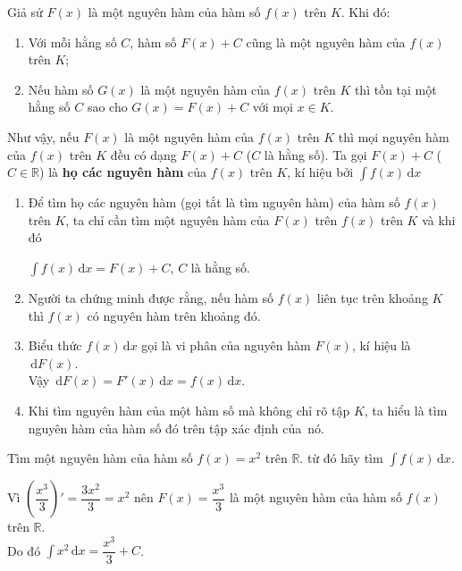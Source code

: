\documentclass[12pt,aspectratio=169]{beamer}
\begin{document}
\begin{tomtat}
	\begin{dn}
		Giả sử $F(x)$ là một nguyên hàm của hàm số $f(x)$ trên $K$. Khi đó:
		\begin{enumerate}
			\item Với mỗi hằng số $C$, hàm số $F(x) + C$ cũng là một nguyên hàm của $f(x)$ trên $K$;
			\item Nếu hàm số $G(x)$ là một nguyên hàm của $f(x)$ trên $K$ thì tồn tại một hằng số $C$ sao cho $G(x) = F(x) + C$ với mọi $x \in K$.
		\end{enumerate}
		Như vậy, nếu $F(x)$ là một nguyên hàm của $f(x)$ trên $K$ thì mọi nguyên hàm của $f(x)$ trên $K$ đều có dạng $F(x) + C$ ($C$ là hằng số). Ta gọi $F(x) + C$ ($C \in \mathbb{R}$) là \textbf{họ các nguyên hàm} của $f(x)$ trên $K$, kí hiệu bởi $\displaystyle\int f(x)\mathrm{\,d}x$
	\end{dn}
\end{tomtat}
\begin{tomtat}
	\begin{note}
		\begin{enumerate}[itemsep=6pt]
			\item Để tìm họ các nguyên hàm (gọi tắt là tìm nguyên hàm) của hàm số $f(x)$ trên $K$, ta chỉ cần tìm một nguyên hàm của $F(x)$ trên $f(x)$ trên $K$ và khi đó
			
			\medskip
			\begin{cangiua}
				$\displaystyle\int f(x)\mathrm{\,d}x = F(x) + C$, $C$ là hằng số.
			\end{cangiua}
			
			\item Người ta chứng minh được rằng, nếu hàm số $f(x)$ liên tục trên khoảng $K$ thì $f(x)$ có nguyên hàm trên khoảng đó.
			\item Biểu thức $f(x)\mathrm{\,d}x$ gọi là vi phân của nguyên hàm $F(x)$, kí hiệu là $\mathrm{\,d}F(x)$.\\
			Vậy $\mathrm{\,d}F(x) = F'(x)\mathrm{\,d}x = f(x)\mathrm{\,d}x$.
			\item Khi tìm nguyên hàm của một hàm số mà không chỉ rõ tập $K$, ta hiểu là tìm nguyên hàm của hàm số đó trên tập xác định của~nó.
		\end{enumerate}
	\end{note}
\end{tomtat}

\begin{vd}\label{vd2}
	Tìm một nguyên hàm của hàm số $f(x) = x^2$ trên $\mathbb{R}$. từ đó hãy tìm $\displaystyle\int f(x)\mathrm{\,d}x$.

	\begin{loigiai}
		Vì $\left(\dfrac{x^3}{3}\right)'=\dfrac{3x^2}{3}=x^2$ nên $F(x)=\dfrac{x^3}{3}$ là một nguyên hàm của hàm số $f(x)$ trên $\mathbb{R}$.\\
		Do đó $\displaystyle\int x^2\mathrm{\,d}x=\dfrac{x^3}{3}+C$.
	\end{loigiai}
\end{vd}
\end{document}
